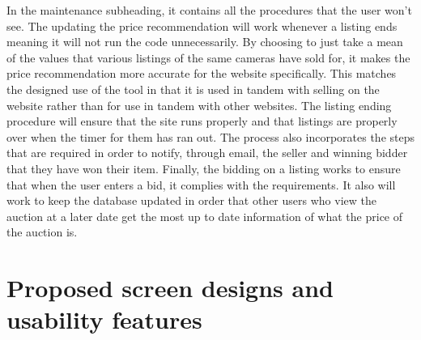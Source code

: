 In the maintenance subheading, it contains all the procedures that the user won’t see. The updating the price recommendation will work whenever a listing ends meaning it will not run the code unnecessarily. By choosing to just take a mean of the values that various listings of the same cameras have sold for, it makes the price recommendation more accurate for the website specifically. This matches the designed use of the tool in that it is used in tandem with selling on the website rather than for use in tandem with other websites. The listing ending procedure will ensure that the site runs properly and that listings are properly over when the timer for them has ran out. The process also incorporates the steps that are required in order to notify, through email, the seller and winning bidder that they have won their item. Finally, the bidding on a listing works to ensure that when the user enters a bid, it complies with the requirements. It also will work to keep the database updated in order that other users who view the auction at a later date get the most up to date information of what the price of the auction is. 

\section{Proposed screen designs and usability features \parencite{wireframe_cc} \parencite{hewer}}
